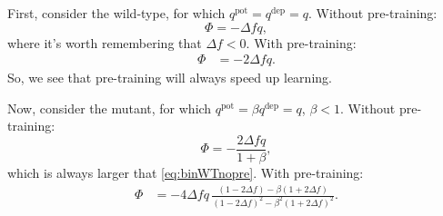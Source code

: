 \documentclass[12pt]{article}
\newcommand{\pot}{^{\text{pot}}}
\newcommand{\dep}{^{\text{dep}}}
\begin{document}
First, consider the wild-type, for which $q\pot=q\dep=q$.
Without pre-training:
%
\begin{equation}\label{eq:binWTnopre}
  \Phi = -\Delta f q,
\end{equation}
%
where it's worth remembering that $\Delta f<0$.
With pre-training:
%
\begin{equation}\label{eq:binWTpre}
\begin{aligned}
  \Phi &= -2\Delta f q.
\end{aligned}
\end{equation}
%
So, we see that pre-training will always speed up learning.

Now, consider the mutant, for which $q\pot=\beta q\dep=q$, $\beta<1$.
Without pre-training:
%
\begin{equation}\label{eq:binKNnopre}
  \Phi = -\frac{2\Delta f q}{1+\beta},
\end{equation}
%
which is always larger that \eqref{eq:binWTnopre}.
With pre-training:
%
\begin{equation}\label{eq:binKnpre}
\begin{aligned}
  \Phi &= -4\Delta f q \, \frac{(1-2\Delta f) - \beta(1+2\Delta f)}
          {(1-2\Delta f)^2 - \beta^2(1+2\Delta f)^2}.
\end{aligned}
\end{equation}
%














\end{document}
